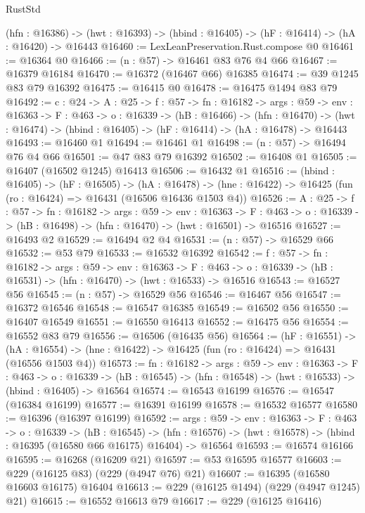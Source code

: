 \begin{lexlean}{RustStd}
\begin{coremodule}
  (hfn : @16386) -> (hwt : @16393) -> (hbind : @16405) -> (hF : @16414) -> (hA : @16420) -> @16443
@16460 := LexLeanPreservation.Rust.compose @0
@16461 := @16364 @0
@16466 := (n : @57) -> @16461 @83 @76 @4 @66
@16467 := @16379 @16184
@16470 := @16372 (@16467 @66) @16385
@16474 := @39 @1245 @83 @79 @16392
@16475 := @16415 @0
@16478 := @16475 @1494 @83 @79
@16492 := {c : @24} ->
  {A : @25} ->
  {f : @57} ->
  {fn : @16182} ->
  {args : @59} ->
  {env : @16363} ->
  {F : @463} ->
  {o : @16339} ->
  (hB : @16466) ->
  (hfn : @16470) -> (hwt : @16474) -> (hbind : @16405) -> (hF : @16414) -> (hA : @16478) -> @16443
@16493 := @16460 @1
@16494 := @16461 @1
@16498 := (n : @57) -> @16494 @76 @4 @66
@16501 := @47 @83 @79 @16392
@16502 := @16408 @1
@16505 := @16407 (@16502 @1245) @16413
@16506 := @16432 @1
@16516 := (hbind : @16405) ->
  (hF : @16505) ->
  (hA : @16478) -> (hne : @16422) -> @16425 (fun (ro : @16424) => @16431 (@16506 @16436 @1503 @4))
@16526 := {A : @25} ->
  {f : @57} ->
  {fn : @16182} ->
  {args : @59} ->
  {env : @16363} ->
  {F : @463} -> {o : @16339} -> (hB : @16498) -> (hfn : @16470) -> (hwt : @16501) -> @16516
@16527 := @16493 @2
@16529 := @16494 @2 @4
@16531 := (n : @57) -> @16529 @66
@16532 := @53 @79
@16533 := @16532 @16392
@16542 := {f : @57} ->
  {fn : @16182} ->
  {args : @59} ->
  {env : @16363} ->
  {F : @463} -> {o : @16339} -> (hB : @16531) -> (hfn : @16470) -> (hwt : @16533) -> @16516
@16543 := @16527 @56
@16545 := (n : @57) -> @16529 @56
@16546 := @16467 @56
@16547 := @16372 @16546
@16548 := @16547 @16385
@16549 := @16502 @56
@16550 := @16407 @16549
@16551 := @16550 @16413
@16552 := @16475 @56
@16554 := @16552 @83 @79
@16556 := @16506 (@16435 @56)
@16564 := (hF : @16551) ->
  (hA : @16554) -> (hne : @16422) -> @16425 (fun (ro : @16424) => @16431 (@16556 @1503 @4))
@16573 := {fn : @16182} ->
  {args : @59} ->
  {env : @16363} ->
  {F : @463} ->
  {o : @16339} -> (hB : @16545) -> (hfn : @16548) -> (hwt : @16533) -> (hbind : @16405) -> @16564
@16574 := @16543 @16199
@16576 := @16547 (@16384 @16199)
@16577 := @16391 @16199
@16578 := @16532 @16577
@16580 := @16396 (@16397 @16199)
@16592 := {args : @59} ->
  {env : @16363} ->
  {F : @463} ->
  {o : @16339} ->
  (hB : @16545) ->
  (hfn : @16576) -> (hwt : @16578) -> (hbind : @16395 (@16580 @66 @16175) @16404) -> @16564
@16593 := @16574 @16166
@16595 := @16268 (@16209 @21)
@16597 := @53 @16595 @16577
@16603 := @229 (@16125 @83) (@229 (@4947 @76) @21)
@16607 := @16395 (@16580 @16603 @16175) @16404
@16613 := @229 (@16125 @1494) (@229 (@4947 @1245) @21)
@16615 := @16552 @16613 @79
@16617 := @229 (@16125 @16416)

\end{coremodule}
\end{lexlean}
